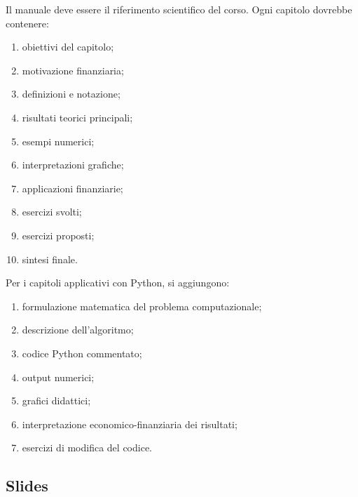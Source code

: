 \documentclass[12pt,a4paper]{article}%
\newcommand{\1}{\mathbf{1}}
\begin{document}
Il manuale deve essere il riferimento scientifico del corso. Ogni capitolo
dovrebbe contenere:

\begin{enumerate}
\item obiettivi del capitolo;

\item motivazione finanziaria;

\item definizioni e notazione;

\item risultati teorici principali;

\item esempi numerici;

\item interpretazioni grafiche;

\item applicazioni finanziarie;

\item esercizi svolti;

\item esercizi proposti;

\item sintesi finale.
\end{enumerate}

Per i capitoli applicativi con Python, si aggiungono:

\begin{enumerate}
\item formulazione matematica del problema computazionale;

\item descrizione dell'algoritmo;

\item codice Python commentato;

\item output numerici;

\item grafici didattici;

\item interpretazione economico-finanziaria dei risultati;

\item esercizi di modifica del codice.
\end{enumerate}

\subsection{Slides}
\end{document}
